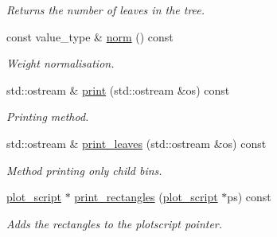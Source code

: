 \begin{DoxyCompactItemize}
\begin{DoxyCompactList}\small\item\em Returns the number of leaves in the tree. \end{DoxyCompactList}\item 
\hypertarget{a00395_a225e526f2d78b9f671ab045a1f7e1e5f}{}const value\+\_\+type \& \hyperlink{a00395_a225e526f2d78b9f671ab045a1f7e1e5f}{norm} () const \label{a00395_a225e526f2d78b9f671ab045a1f7e1e5f}

\begin{DoxyCompactList}\small\item\em Weight normalisation. \end{DoxyCompactList}\item 
\hypertarget{a00395_a3ba3f8bbcbc2698e93d85619fb71fcb8}{}std\+::ostream \& \hyperlink{a00395_a3ba3f8bbcbc2698e93d85619fb71fcb8}{print} (std\+::ostream \&os) const \label{a00395_a3ba3f8bbcbc2698e93d85619fb71fcb8}

\begin{DoxyCompactList}\small\item\em Printing method. \end{DoxyCompactList}\item 
\hypertarget{a00395_a4fc6028e85234e6da773f0c6379913b8}{}std\+::ostream \& \hyperlink{a00395_a4fc6028e85234e6da773f0c6379913b8}{print\+\_\+leaves} (std\+::ostream \&os) const \label{a00395_a4fc6028e85234e6da773f0c6379913b8}

\begin{DoxyCompactList}\small\item\em Method printing only child bins. \end{DoxyCompactList}\item 
\hypertarget{a00395_a769c2a70d65dbeee08d1efd854342439}{}\hyperlink{a00431}{plot\+\_\+script} $\ast$ \hyperlink{a00395_a769c2a70d65dbeee08d1efd854342439}{print\+\_\+rectangles} (\hyperlink{a00431}{plot\+\_\+script} $\ast$ps) const \label{a00395_a769c2a70d65dbeee08d1efd854342439}

\begin{DoxyCompactList}\small\item\em Adds the rectangles to the plotscript pointer. \end{DoxyCompactList}\end{DoxyCompactItemize}
